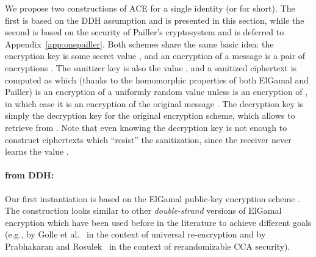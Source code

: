 \documentclass{llncs}
\begin{document}
We propose two constructions of ACE for a single identity (or \oACE for short). The first is based on the DDH assumption and is presented in this section, while the second is based on the security of Pailler's cryptosystem and is deferred to Appendix~\ref{app:onepailler}. Both schemes share the same basic idea: the encryption key  is some secret value , and an encryption of a message  is a pair of encryptions . The sanitizer key is also the value , and a sanitized ciphertext is computed as  which (thanks to the homomorphic properties of both ElGamal and Pailler) is an encryption of a uniformly random value unless  is an encryption of , in which case it is an encryption of the original message . The decryption key is simply the decryption key for the original encryption scheme, which allows to retrieve  from . Note that even knowing the decryption key is not enough to construct ciphertexts which ``resist'' the sanitization, since the receiver never learns the value .



\paragraph{\oACE from DDH:}
Our first instantiation is based on the ElGamal public-key encryption scheme \cite{DBLP:journals/tit/Elgamal85}. The construction looks similar to other \emph{double-strand} versions of ElGamal encryption which have been used before in the literature to achieve different goals (e.g., by Golle et al.~\cite{DBLP:conf/ctrsa/GolleJJS04} in the context of universal re-encryption and by Prabhakaran and Rosulek~\cite{DBLP:conf/crypto/PrabhakaranR07} in the context of rerandomizable CCA security). 
\end{document}
